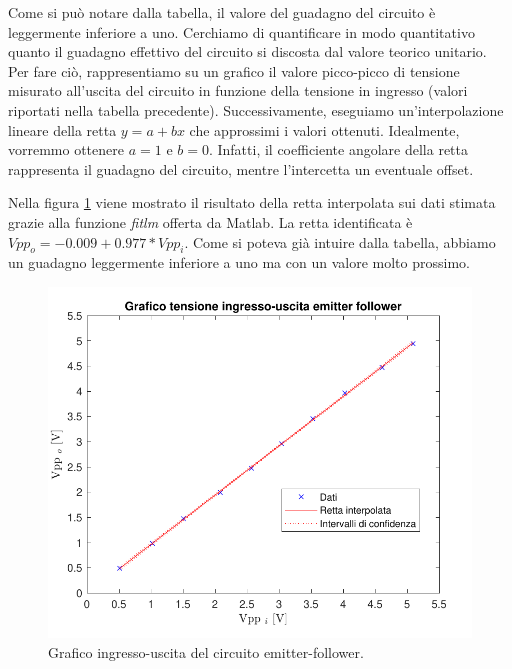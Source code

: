Come si può notare dalla tabella, il valore del guadagno del circuito è leggermente inferiore a uno. Cerchiamo di quantificare in modo quantitativo quanto il guadagno effettivo del circuito si discosta dal valore teorico unitario. Per fare ciò, rappresentiamo su un grafico il valore picco-picco di tensione misurato all'uscita del circuito in funzione della tensione in ingresso (valori riportati nella tabella precedente). Successivamente, eseguiamo un'interpolazione lineare della retta $y=a+bx$ che approssimi i valori ottenuti. Idealmente, vorremmo ottenere $a=1$ e $b=0$. Infatti, il coefficiente angolare della retta rappresenta il guadagno del circuito, mentre l'intercetta un eventuale offset.

Nella figura \ref{fig:emitterfollwer_inout} viene mostrato il risultato della retta interpolata sui dati stimata grazie alla funzione \textit{fitlm} offerta da Matlab. La retta identificata è $Vpp_o=-0.009+0.977*Vpp_i$. Come si poteva già intuire dalla tabella, abbiamo un guadagno leggermente inferiore a uno ma con un valore molto prossimo.
\begin{figure}[h!]
	\centering
	\includegraphics[width=0.7\linewidth]{./OtherFiles/Laboratorio 2/emitter follower-ingresso_uscita}
	\caption{Grafico ingresso-uscita del circuito emitter-follower.}
	\label{fig:emitterfollwer_inout}
\end{figure}

